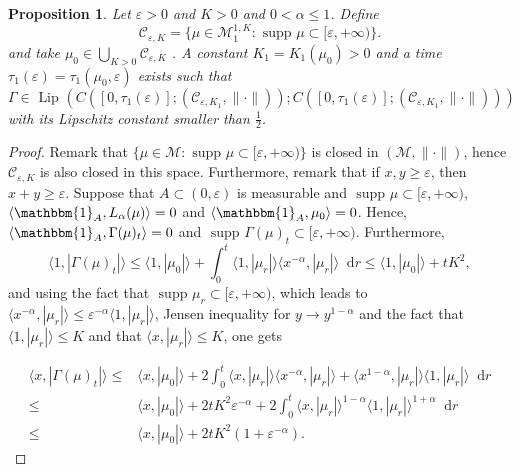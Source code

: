 \documentclass[a4paper,11pt, reqno]{amsart}
\newcommand{\cC}{\mathcal{C}}	\newcommand{\CC}{\mathbbm{C}}
\newcommand{\cM}{\mathcal{M}}	\newcommand{\MM}{\mathbbm{M}}
\newcommand{\eps}{\varepsilon}
\newcommand{\dd}{\mathop{}\!\mathrm{d}}
\newcommand{\1}{\mathbbm{1}}
\theoremstyle{plain}
\newtheorem{proposition}[theorem]{Proposition}
\theoremstyle{definition}
\begin{document}
\begin{proposition}
  \label{prop:contraction}Let $\eps > 0$ and $K > 0$ and $0 < \alpha
  \le 1$. Define
  \[ \cC_{\eps, K} = \{ \mu \in \cM_1^{1, K} :
      \text{ supp } \mu \subset [\eps, + \infty) \} . \]
  and take $\mu_0 \in \bigcup_{K > 0} \cC_{\eps, K}$ . A
  constant $K_1 = K_1 (\mu_0) > 0$ and a time $\tau_1 (\eps) = \tau_1
  (\mu_0, \eps)$ exists such that
  \[ \Gamma \in  \text{ Lip } (C ([0, \tau_1 (\eps)] ;
     (\cC_{\eps, K_1}, \| \cdot \|)) ; C ([0, \tau_1
     (\eps)] ; (\cC_{\eps, K_1}, \| \cdot \|))) \]
  with its Lipschitz constant smaller than $\frac{1}{2}$.
\end{proposition}

\begin{proof}
  Remark that $\{ \mu \in \cM:  \text{ supp } \mu \subset [\eps, +
  \infty) \}$ is closed in $(\cM, \| \cdot \|)$, hence
  $\cC_{\eps, K}$ is also closed in this space. Furthermore,
  remark that if $x, y \ge \eps$, then $x + y \ge
  \eps$. Suppose that $A \subset (0, \eps)$ is measurable and
  $ \text{ supp } \mu \subset [\eps, + \infty)$, $\langle \mathbbm{1}_A,
  L_{\alpha} (\mu) \rangle = 0$ and $\langle \mathbbm{1}_A, \mu_0 \rangle =
  0$. Hence, $\langle \mathbbm{1}_A, \Gamma (\mu)_t \rangle = 0$ and
  $ \text{ supp } \Gamma (\mu)_t \subset [\eps, + \infty)$. Furthermore,
  \[ \langle 1, | \Gamma (\mu)_t | \rangle \le \langle 1, | \mu_0 |
     \rangle + \int_0^t \langle 1, | \mu_r | \rangle \langle x^{- \alpha}, |
     \mu_r | \rangle \dd r \le \langle 1, | \mu_0 | \rangle + t K^2,
  \]
  and using the fact that $ \text{ supp } \mu_r \subset [\eps, + \infty)$,
  which leads to $\langle x^{- \alpha}, | \mu_r | \rangle \le
  \eps^{- \alpha} \langle 1, | \mu_r | \rangle$, Jensen inequality for
  $y \rightarrow y^{1 - \alpha}$ and the fact that $\langle 1, | \mu_r |
  \rangle \le K$ and that $\langle x, | \mu_r | \rangle \le K$,
  one gets
  
  \begin{align*}
    \langle x, | \Gamma (\mu)_t | \rangle \le & \langle x, | \mu_0 |
    \rangle + 2 \int_0^t \langle x, | \mu_r | \rangle \langle x^{- \alpha}, |
    \mu_r | \rangle + \langle x^{1 - \alpha}, | \mu_r | \rangle \langle 1, |
    \mu_r | \rangle \dd r\\
    \le & \langle x, | \mu_0 | \rangle + 2 t K^2 \eps^{- \alpha}
    + 2 \int_0^t \langle x, | \mu_r | \rangle^{1 - \alpha} \langle 1, | \mu_r
    | \rangle^{1 + \alpha} \dd r\\
    \le & \langle x, | \mu_0 | \rangle + 2 t K^2 (1 + \eps^{-
    \alpha}) .
  \end{align*}
  

\end{proof}
\end{document}
